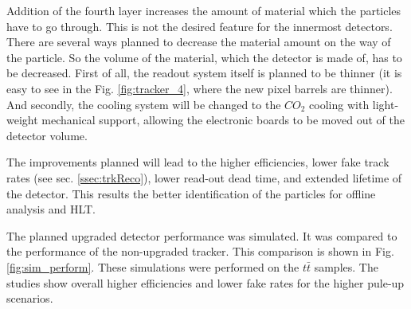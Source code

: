 Addition of the fourth layer increases the amount of material which the particles have to go through. This is not
the desired feature for the innermost detectors. There are several ways planned to decrease the material amount on the 
way of the particle. So the volume of the material, which the detector is made of, has to be decreased. 
First of all, the readout system itself is planned to be thinner (it is easy to see in the Fig. \ref{fig:tracker_4},
where the new pixel barrels are thinner). And secondly, the cooling system will be changed to the $CO_{2}$ cooling \cite{CMS:2012sda} with 
light-weight mechanical support, allowing the electronic boards to be moved out of the detector volume.

The improvements planned will lead to the higher efficiencies, lower fake track rates (see sec. \ref{ssec:trkReco}), lower read-out dead time,
and extended lifetime of the detector. This results the better identification of the particles for offline analysis and HLT.

The planned upgraded detector performance was simulated. It was compared to the performance of the non-upgraded tracker. This comparison
is shown in Fig. \ref{fig:sim_perform}. These simulations were performed on the $t\bar{t}$ samples. The studies show overall higher 
efficiencies and lower fake rates for the higher pule-up scenarios.

